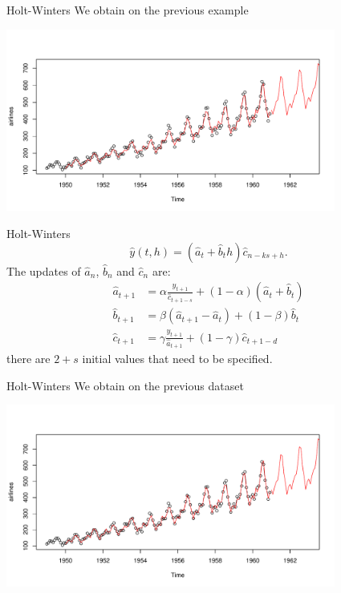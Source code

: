 \documentclass{beamer}
\begin{document}
\begin{frame}{Holt-Winters}
We obtain on the previous example
\begin{center}
\includegraphics[height=6cm]{figures/R/HoltWintersseasonadd}
\end{center}
\end{frame}

\begin{frame}{Holt-Winters}
\\
$$ \hat{y}(t,h) = (\hat{a}_t + \hat{b}_t h) \hat{c}_{n-ks+h}.$$
The updates of $\hat{a}_n$, $\hat{b}_n$ and $\hat{c}_n$ are:
\begin{equation*}
  \begin{split}
    \hat{a}_{t+1} &= \alpha \frac{y_{t+1}}{\hat{c}_{t+1-s}}  + (1 - \alpha)(\hat{a}_{t} + \hat{b}_{t}) \\
    \hat{b}_{t+1} &= \beta (\hat{a}_{t+1} - \hat{a}_{t}) + (1 - \beta)\hat{b}_{t}\\
    \hat{c}_{t+1} &= \gamma \frac{y_{t+1}}{\hat{a}_{t+1}} + (1 - \gamma)\hat{c}_{t+1-d}
  \end{split}
\end{equation*}
there are $2+s$ initial values that need to be specified.
\end{frame}

\begin{frame}{Holt-Winters}
We obtain on the previous dataset
\begin{center}
\includegraphics[height=6cm]{figures/R/HoltWintersseasonmult}
\end{center}
\end{frame}
\end{document}
